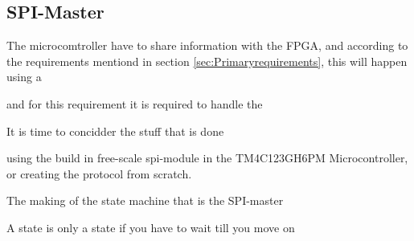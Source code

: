 \subsection{SPI-Master}
\label{sec:SPIMaster}

The microcomtroller have to share information with the FPGA, and according to the requirements mentiond in section \ref{sec:Primaryrequirements}, this will happen using a 

and for this requirement it is required to handle the 

It is time to concidder the stuff that is done 

using the build in free-scale spi-module in the TM4C123GH6PM Microcontroller, or creating the protocol from scratch. 

The making of the state machine that is the SPI-master

A state is only a state if you have to wait till you move on
